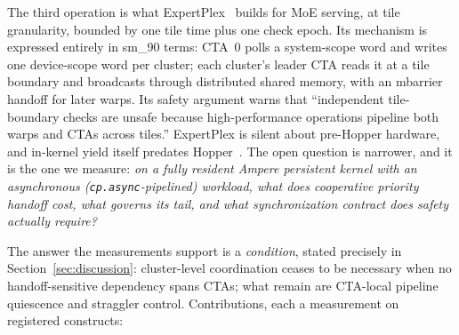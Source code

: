 \documentclass[11pt]{article}
\begin{document}
The third operation is what ExpertPlex~\cite{expertplex} builds for
MoE serving, at tile granularity, bounded by one tile time plus one
check epoch. Its mechanism is expressed entirely in sm\_90 terms:
CTA~0 polls a system-scope word and writes one device-scope word per
cluster; each cluster's leader CTA reads it at a tile boundary and
broadcasts through distributed shared memory, with an mbarrier
handoff for later warps. Its safety argument warns that ``independent
tile-boundary checks are unsafe because high-performance operations
pipeline both warps and CTAs across tiles.'' ExpertPlex is silent
about pre-Hopper hardware, and in-kernel yield itself predates
Hopper~\cite{coopkernels,mpk}. The open question is narrower, and it
is the one we measure: \emph{on a fully resident Ampere persistent
kernel with an asynchronous (\texttt{cp.async}-pipelined) workload,
what does cooperative priority handoff cost, what governs its tail,
and what synchronization contract does safety actually require?}

The answer the measurements support is a \emph{condition}, stated
precisely in Section~\ref{sec:discussion}: cluster-level coordination
ceases to be necessary when no handoff-sensitive dependency spans
CTAs; what remain are CTA-local pipeline quiescence and straggler
control. Contributions, each a measurement on registered constructs:
\end{document}
